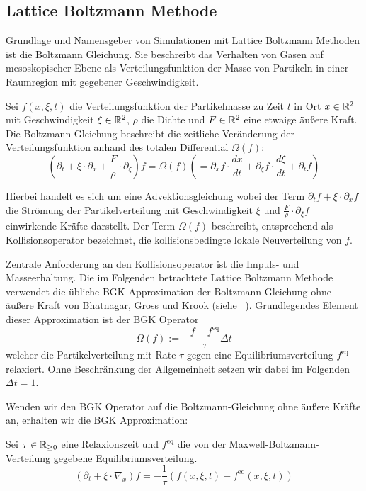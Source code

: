 \subsection{Lattice Boltzmann Methode}\label{kap:LBM}

Grundlage und Namensgeber von Simulationen mit Lattice Boltzmann Methoden ist die Boltzmann Gleichung. Sie beschreibt das Verhalten von Gasen auf mesoskopischer Ebene als Verteilungsfunktion der Masse von Partikeln in einer Raumregion mit gegebener Geschwindigkeit.

\begin{Definition}
Sei \(f(x,\xi,t)\) die Verteilungsfunktion der Partikelmasse zu Zeit \(t\) in Ort \(x \in \mathbb{R}^2\) mit Geschwindigkeit \(\xi \in \mathbb{R}^2\), \(\rho\) die Dichte und \(F \in \mathbb{R}^2\) eine etwaige äußere Kraft. Die Boltzmann-Gleichung beschreibt die zeitliche Veränderung der Verteilungsfunktion anhand des totalen Differential \(\Omega(f)\):
\[ \left( \partial_t + \xi \cdot \partial_x + \frac{F}{\rho} \cdot \partial_\xi \right) f = \Omega(f) \left( = \partial_x f \cdot \frac{dx}{dt} + \partial_\xi f \cdot \frac{d\xi}{dt} + \partial_t f \right) \]

Hierbei handelt es sich um eine Advektionsgleichung wobei der Term \(\partial_t f + \xi \cdot \partial_x f\) die Strömung der Partikelverteilung mit Geschwindigkeit \(\xi\) und \(\frac{F}{\rho} \cdot \partial_\xi f\) einwirkende Kräfte darstellt. Der Term \(\Omega(f)\) beschreibt, entsprechend als Kollisionsoperator bezeichnet, die kollisionsbedingte lokale Neuverteilung von \(f\).
\end{Definition}

Zentrale Anforderung an den Kollisionsoperator ist die Impuls- und Masseerhaltung. Die im Folgenden betrachtete Lattice Boltzmann Methode verwendet die übliche BGK Approximation der Boltzmann-Gleichung ohne äußere Kraft von Bhatnagar, Gross und Krook (siehe ~\cite[Kap.~3.5.3]{krueger17}).
Grundlegendes Element dieser Approximation ist der BGK Operator
\[\Omega(f) := -\frac{f-f^\text{eq}}{\tau} \Delta t\]
welcher die Partikelverteilung mit Rate \(\tau\) gegen eine Equilibriumsverteilung \(f^\text{eq}\) relaxiert. Ohne Beschränkung der Allgemeinheit setzen wir dabei  im Folgenden \(\Delta t = 1\).

Wenden wir den BGK Operator auf die Boltzmann-Gleichung ohne äußere Kräfte an, erhalten wir die BGK Approximation:

\begin{Definition}
Sei \(\tau \in \mathbb{R}_{\geq 0}\) eine Relaxionszeit und \(f^\text{eq}\) die von der Maxwell-Boltzmann-Verteilung gegebene Equilibriumsverteilung.
\[ (\partial_t + \xi \cdot \nabla_x) f = -\frac{1}{\tau} (f(x,\xi,t) - f^\text{eq}(x,\xi,t)) \]
\end{Definition}

